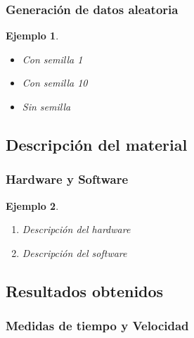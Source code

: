 \documentclass{beamer}
\newtheorem{ejemplo}{Ejemplo}
\begin{document}
\begin{frame}
\frametitle{Generación de datos aleatoria}

\begin{ejemplo}
  \begin{itemize}
    \item <1-> Con semilla 1 
    \item <2-> Con semilla 10 
    \item <3> Sin semilla 
  \end{itemize}
\end{ejemplo}

\end{frame}

\subsection{Descripción del material}
\begin{frame}
\frametitle{Hardware y Software}

\begin{ejemplo}
  \begin{enumerate}
    \item
      Descripción del hardware 
      \pause

    \item
      Descripción del software 
  \end{enumerate}
\end{ejemplo}

\end{frame}

\subsection{Resultados obtenidos}
\begin{frame}
\frametitle{Medidas de tiempo y Velocidad}



\end{frame}
\end{document}
